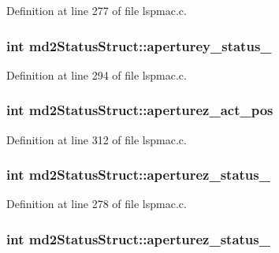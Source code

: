 Definition at line 277 of file lspmac.\-c.

\hypertarget{structmd2StatusStruct_a0a7738f13a0fa80626cafc2299b104b4}{
\subsubsection[{aperturey\-\_\-status\-\_\-2}]{\setlength{\rightskip}{0pt plus 5cm}int md2\-Status\-Struct\-::aperturey\-\_\-status\-\_}}\label{structmd2StatusStruct_a0a7738f13a0fa80626cafc2299b104b4}


Definition at line 294 of file lspmac.\-c.

\hypertarget{structmd2StatusStruct_a62d584ce23cfd9aa626d3c03649b455c}{
\subsubsection[{aperturez\-\_\-act\-\_\-pos}]{\setlength{\rightskip}{0pt plus 5cm}int md2\-Status\-Struct\-::aperturez\-\_\-act\-\_\-pos}}\label{structmd2StatusStruct_a62d584ce23cfd9aa626d3c03649b455c}


Definition at line 312 of file lspmac.\-c.

\hypertarget{structmd2StatusStruct_a27880dd795e1ba4fea4870c64ee3aa84}{
\subsubsection[{aperturez\-\_\-status\-\_\-1}]{\setlength{\rightskip}{0pt plus 5cm}int md2\-Status\-Struct\-::aperturez\-\_\-status\-\_}}\label{structmd2StatusStruct_a27880dd795e1ba4fea4870c64ee3aa84}


Definition at line 278 of file lspmac.\-c.

\hypertarget{structmd2StatusStruct_ae407a99e428d9f4a7444a02c8bc3414e}{
\subsubsection[{aperturez\-\_\-status\-\_\-2}]{\setlength{\rightskip}{0pt plus 5cm}int md2\-Status\-Struct\-::aperturez\-\_\-status\-\_}}\label{structmd2StatusStruct_ae407a99e428d9f4a7444a02c8bc3414e}


